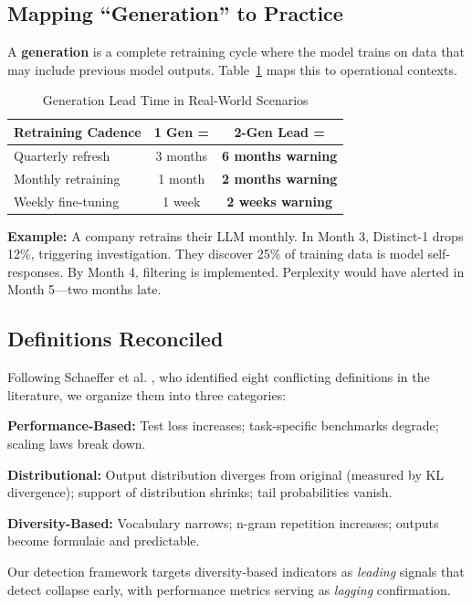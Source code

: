 \documentclass[conference]{IEEEtran}
\begin{document}
\subsection{Mapping ``Generation'' to Practice}
\label{sec:generation_definition}

A \textbf{generation} is a complete retraining cycle where the model trains on data that may include previous model outputs. Table~\ref{tab:generation_mapping} maps this to operational contexts.

\begin{table}[!t]
\caption{Generation Lead Time in Real-World Scenarios}
\label{tab:generation_mapping}
\centering
\small
\begin{tabular}{@{}lcc@{}}
\toprule
\textbf{Retraining Cadence} & \textbf{1 Gen =} & \textbf{2-Gen Lead =} \\
\midrule
Quarterly refresh & 3 months & \textbf{6 months warning} \\
Monthly retraining & 1 month & \textbf{2 months warning} \\
Weekly fine-tuning & 1 week & \textbf{2 weeks warning} \\
\bottomrule
\end{tabular}
\end{table}

\textbf{Example:} A company retrains their LLM monthly. In Month 3, Distinct-1 drops 12\%, triggering investigation. They discover 25\% of training data is model self-responses. By Month 4, filtering is implemented. Perplexity would have alerted in Month 5---two months late.

\subsection{Definitions Reconciled}

Following Schaeffer et al. \cite{schaeffer2025position}, who identified eight conflicting definitions in the literature, we organize them into three categories:

\textbf{Performance-Based:} Test loss increases; task-specific benchmarks degrade; scaling laws break down.

\textbf{Distributional:} Output distribution diverges from original (measured by KL divergence); support of distribution shrinks; tail probabilities vanish.

\textbf{Diversity-Based:} Vocabulary narrows; n-gram repetition increases; outputs become formulaic and predictable.

Our detection framework targets diversity-based indicators as \textit{leading} signals that detect collapse early, with performance metrics serving as \textit{lagging} confirmation.
\end{document}
